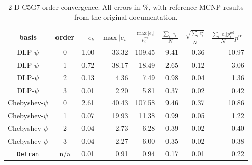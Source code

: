 \begin{table}[ht] 
 
\begin{center} 

 \caption{2-D C5G7 order convergence.  All errors in \%, with 
          reference MCNP results from the original documentation.} 
 \label{tbl:c5g7_order_convergence} 

  \begin{threeparttable}
 \begin{tabular}{ccrrrrrr} 
 \toprule 
 basis & order & $e_k$\tnote{a}   & $\max |e_i|$\tnote{b}  & $ \frac{\max |e_i|}{p^{\text{ref}}_i} $  
   & $\frac{\sum_i |e_i|}{ N}$   &  $\frac{\sqrt{\sum_{i} e_{i}^2}}{N}$   
     & $ \frac{\sum_i |e_i|p^{\text{ref}}_i}{N} \bar{p}^{\text{ref}}$    \\
 \midrule 
 DLP-$\psi$  &    0  &     1.00   &    33.32   &   109.45   &     9.41   &     0.36   &    10.97   \\
 DLP-$\psi$  &    1  &     0.72   &    38.17   &    18.49   &     2.65   &     0.12   &     3.06   \\
 DLP-$\psi$  &    2  &     0.13   &     4.36   &     7.49   &     0.98   &     0.04   &     1.36   \\
 DLP-$\psi$  &    3  &     0.01   &     2.20   &     5.81   &     0.37   &     0.02   &     0.42   \\
 \midrule 
 Chebyshev-$\psi$  &    0  &     2.61   &    40.43   &   107.58   &     9.46   &     0.37   &    10.86   \\
 Chebyshev-$\psi$  &    1  &     0.07   &    19.93   &    11.38   &     0.99   &     0.05   &     1.22   \\
 Chebyshev-$\psi$  &    2  &     0.04   &     2.73   &     6.28   &     0.39   &     0.02   &     0.40   \\
 Chebyshev-$\psi$  &    3  &     0.04   &     2.27   &     6.00   &     0.35   &     0.02   &     0.38   \\
 \midrule 
 {\tt Detran}\tnote{c} & n/a  &     0.01   &     0.91   &     0.94   &     0.17   &     0.01   &     0.22   \\


\end{tabular}
\end{threeparttable}
\end{center}
\end{table}

